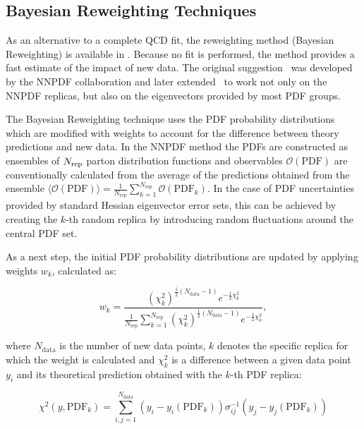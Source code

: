 \subsection{Bayesian Reweighting Techniques}

As an alternative to a complete QCD fit, the reweighting method (Bayesian Reweighting) is available in \fitter.
Because no fit is performed, the method provides a fast estimate of the impact of new data. 
The original suggestion~\cite{Giele:1998gw} was developed by the NNPDF 
collaboration \cite{Ball:2011gg,Ball:2010gb} and later extended~\cite{Watt:2012tq}
to work not only on the NNPDF replicas, but also on the eigenvectors provided by most PDF groups. 

The Bayesian Reweighting technique uses the PDF probability distributions which are modified with weights 
to account for the difference between theory predictions and new data.
In the NNPDF method the PDFs are constructed as ensembles of $N_{\rm rep}$ parton 
distribution functions and observables $\mathcal{O}(\mathrm{PDF})$ are conventionally calculated from the average
of the predictions obtained from the ensemble 
$\langle\mathcal{O}(\mathrm{PDF})\rangle =  \frac{1}{N_{\mathrm{rep}}} \sum_{k=1}^{N_{\mathrm{rep}}} \mathcal{O}(\mathrm{PDF}_k)$.
In the case of PDF uncertainties provided by standard Hessian eigenvector error sets, this can be achieved 
by creating the $k$-th random replica by introducing random fluctuations around the central PDF set.

As a next step, the initial PDF probability distributions are updated by applying weights 
$w_k$, calculated as:

\begin{equation}
 w_k = \frac{(\chi^2_k)^{\frac{1}{2} (N_{\mathrm{data}}-1) } e^{-\frac{1}{2}\chi^2_k}}{ \frac{1}{N_{\mathrm{rep}}} \sum^{N_{\mathrm{rep}}}_{k=1}(\chi^2_k)^{\frac{1}{2}(N_{\mathrm{data}}-1)} e^{-\frac{1}{2}\chi^2_k}  },
\end{equation}

where $N_{\mathrm{data}}$ is the number of new data points, $k$ denotes the specific replica for which the weight is calculated 
and $\chi^2_k$ is a difference between a given data point $y_i$ and its theoretical prediction obtained with the $k$-th PDF replica:

{\small
\begin{equation}
 \chi^2 (y,\mathrm{PDF}_k) = \sum_{i,j=1}^{N_{\mathrm{data}}} (y_i - y_i(\mathrm{PDF}_k)) \sigma^{-1}_{ij} (y_j-y_j(\mathrm{PDF}_k))  
\end{equation}
}

